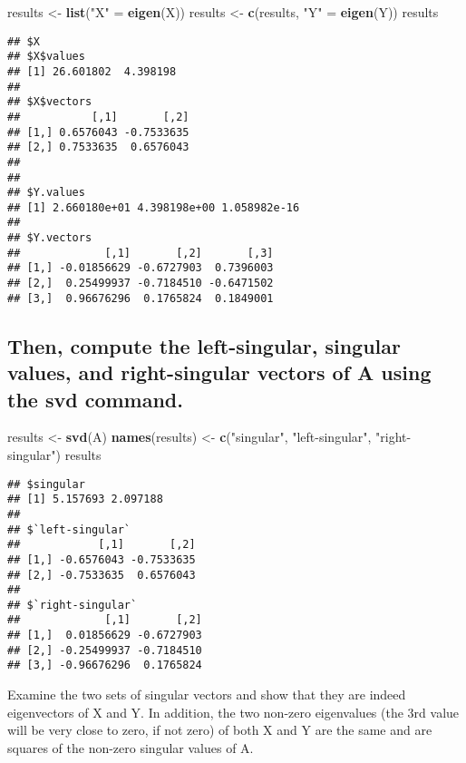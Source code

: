 \documentclass[]{article}
\newenvironment{Shaded}{\begin{snugshade}}{\end{snugshade}}
\newcommand{\KeywordTok}[1]{\textcolor[rgb]{0.13,0.29,0.53}{\textbf{{#1}}}}
\newcommand{\StringTok}[1]{\textcolor[rgb]{0.31,0.60,0.02}{{#1}}}
\newcommand{\NormalTok}[1]{{#1}}
\begin{document}
\begin{Shaded}
\begin{Highlighting}[]
\NormalTok{results <-}\StringTok{ }\KeywordTok{list}\NormalTok{(}\StringTok{"X"} \NormalTok{=}\StringTok{ }\KeywordTok{eigen}\NormalTok{(X))}
\NormalTok{results <-}\StringTok{ }\KeywordTok{c}\NormalTok{(results, }\StringTok{"Y"} \NormalTok{=}\StringTok{ }\KeywordTok{eigen}\NormalTok{(Y))}
\NormalTok{results}
\end{Highlighting}
\end{Shaded}

\begin{verbatim}
## $X
## $X$values
## [1] 26.601802  4.398198
## 
## $X$vectors
##           [,1]       [,2]
## [1,] 0.6576043 -0.7533635
## [2,] 0.7533635  0.6576043
## 
## 
## $Y.values
## [1] 2.660180e+01 4.398198e+00 1.058982e-16
## 
## $Y.vectors
##             [,1]       [,2]       [,3]
## [1,] -0.01856629 -0.6727903  0.7396003
## [2,]  0.25499937 -0.7184510 -0.6471502
## [3,]  0.96676296  0.1765824  0.1849001
\end{verbatim}

\subsection{Then, compute the left-singular, singular values, and
right-singular vectors of A using the svd
command.}\label{then-compute-the-left-singular-singular-values-and-right-singular-vectors-of-a-using-the-svd-command.}

\begin{Shaded}
\begin{Highlighting}[]
\NormalTok{results <-}\StringTok{ }\KeywordTok{svd}\NormalTok{(A)}
\KeywordTok{names}\NormalTok{(results) <-}\StringTok{ }\KeywordTok{c}\NormalTok{(}\StringTok{"singular"}\NormalTok{, }\StringTok{"left-singular"}\NormalTok{, }\StringTok{"right-singular"}\NormalTok{)}
\NormalTok{results}
\end{Highlighting}
\end{Shaded}

\begin{verbatim}
## $singular
## [1] 5.157693 2.097188
## 
## $`left-singular`
##            [,1]       [,2]
## [1,] -0.6576043 -0.7533635
## [2,] -0.7533635  0.6576043
## 
## $`right-singular`
##             [,1]       [,2]
## [1,]  0.01856629 -0.6727903
## [2,] -0.25499937 -0.7184510
## [3,] -0.96676296  0.1765824
\end{verbatim}

Examine the two sets of singular vectors and show that they are indeed
eigenvectors of X and Y. In addition, the two non-zero eigenvalues (the
3rd value will be very close to zero, if not zero) of both X and Y are
the same and are squares of the non-zero singular values of A.
\end{document}
